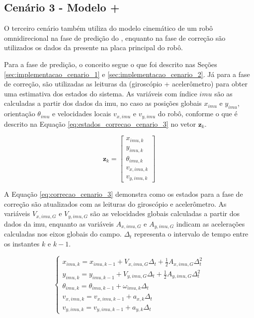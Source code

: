 \documentclass[acronym, symbols, table]{fei}
\begin{document}
		\subsection{Cenário 3 - Modelo + } \label{sec:implementacao_cenario_3}
		
			O terceiro cenário também utiliza do modelo cinemático de um robô omnidirecional na fase de predição do , enquanto na fase de correção são utilizados os dados da  presente na placa principal do robô.
			
			Para a fase de predição, o conceito segue o que foi descrito nas Seções \ref{sec:implementacao_cenario_1} e \ref{sec:implementacao_cenario_2}. Já para a fase de correção, são utilizadas as leituras da  (giroscópio + acelerômetro) para obter uma estimativa dos estados do sistema. As variáveis com índice $imu$ são as calculadas a partir dos dados da \acrshort{imu}, no caso as posições globais $x_{imu}$ e $y_{imu}$, orientação $\theta_{imu}$ e velocidades locais $v_{x,imu}$ e $v_{y,imu}$ do robô, conforme o que é descrito na Equação \eqref{eq:estados_correcao_cenario_3} no vetor $\textbf{z}_k$.
			
	 		\begin{equation}\label{eq:estados_correcao_cenario_3}
				\textbf{z}_k  = 
				\begin{bmatrix}
					x_{imu,k} \\
					y_{imu,k} \\
					\theta_{imu,k} \\
					v_{x,imu,k} \\
					v_{y,imu,k}
				\end{bmatrix}
			\end{equation}
		
			A Equação \eqref{eq:correcao_cenario_3} demonstra como os estados para a fase de correção são atualizados com as leituras do giroscópio e acelerômetro. As variáveis $V_{x,imu,G}$ e $V_{y,imu,G}$ são as velocidades globais calculadas a partir dos dados da \acrshort{imu}, enquanto as variáveis $A_{x,imu,G}$ e $A_{y,imu,G}$ indicam as acelerações calculadas nos eixos globais do campo. $\Delta_t$ representa o intervalo de tempo entre os instantes $k$ e $k-1$.
			
			\begin{equation}\label{eq:correcao_cenario_3}
				\begin{cases}
					x_{imu,k} = x_{imu, k-1} + V_{x,imu,G} \Delta_t + \frac{1}{2}A_{x,imu,G} \Delta_t^2 \\
					y_{imu,k} = y_{imu, k-1} + V_{y,imu,G} \Delta_t + \frac{1}{2}A_{y,imu,G} \Delta_t^2 \\
					\theta_{imu,k} = \theta_{imu, k-1} + \omega_{imu,k} \Delta_t \\
					v_{x,imu,k} = v_{x,imu,k-1} + a_{x,k} \Delta_t\\
					v_{y,imu,k} = v_{y,imu,k-1} + a_{y,k} \Delta_t
				\end{cases}
			\end{equation}
		
\end{document}
